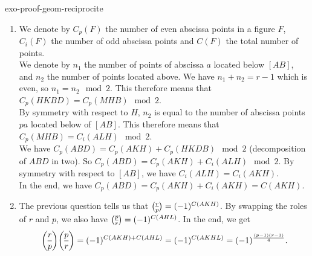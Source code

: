 \begin{correction}{exo-proof-geom-reciprocite}
\begin{enumerate}
\item {} We denote by $ C_p (F) $ the number of even abscissa points in a figure $ F $, $ C_i (F) $ the number of odd abscissa points and $ C (F) $ the total number of points. \\We denote by $ n_1 $ the number of points of abscissa $ a $ located below $ [AB] $, and $ n_2 $ the number of points located above. We have $ n_1 + n_2 = r-1 $ which is even, so $ n_1 = n_2 \mod{2} $. This therefore means that $ C_p (HKBD) = C_p (MHB) \mod{2} $. \\By symmetry with respect to $ H $, $ n_2 $ is equal to the number of abscissa points $ pa $ located below of $ [AB] $. This therefore means that $ C_p (MHB) = C_i (ALH) \mod{2} $. \\We have $ C_p (ABD) = C_p (AKH) + C_p (HKDB) \mod{2} $ (decomposition of $ ABD $ in two). So $ C_p (ABD) = C_p (AKH) + C_i (ALH) \mod{2} $. By symmetry with respect to $ [AB] $, we have $ C_i (ALH) = C_i (AKH) $. \\In the end, we have $ C_p (ABD) = C_p (AKH) + C_i (AKH) = C ( AKH) $.
\item The previous question tells us that $ \legsymb{r}{p} = (-1)^{C (AKH)} $. By swapping the roles of $ r $ and $ p $, we also have $ \legsymb{p}{r} = (-1)^{C (AHL)} $. In the end, we get
\begin{equation*}
\legsymb{r}{p} \legsymb{p}{r} = (-1)^{C (AKH) + C (AHL)} = (-1)^{C (AKHL)} = (-1)^{\frac{(p-1) (r-1)}{4}}.
\end{equation*}
\end{enumerate}
\end{correction}
 
